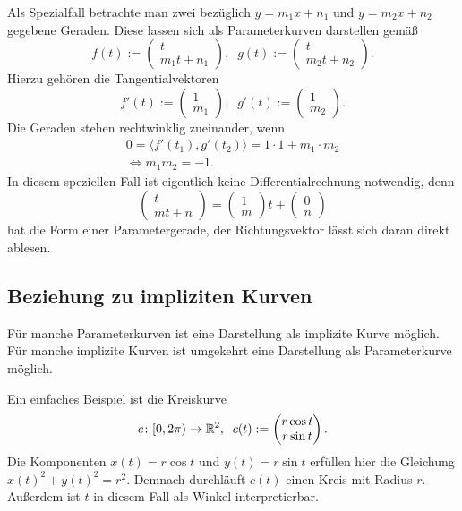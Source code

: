 Als Spezialfall betrachte man zwei bezüglich $y=m_1 x+n_1$ und
$y=m_2 x+n_2$ gegebene Geraden. Diese lassen sich als Parameterkurven
darstellen gemäß
\[
f(t) := \begin{pmatrix}t\\ m_1 t+n_1\end{pmatrix},\;\;
g(t) := \begin{pmatrix}t\\ m_2 t+n_2\end{pmatrix}.
\]
Hierzu gehören die Tangentialvektoren
\[
f'(t) := \begin{pmatrix}1\\ m_1\end{pmatrix},\;\;
g'(t) := \begin{pmatrix}1\\ m_2\end{pmatrix}.
\]
Die Geraden stehen rechtwinklig zueinander, wenn%
\begin{gather*}
0 = \langle f'(t_1),g'(t_2)\rangle = 1\cdot 1+m_1\cdot m_2\\
\iff m_1 m_2 = -1.
\end{gather*}
In diesem speziellen Fall ist eigentlich keine Differentialrechnung
notwendig, denn
\[\begin{pmatrix}t\\ m t+n\end{pmatrix}
= \begin{pmatrix}1\\ m\end{pmatrix}t+\begin{pmatrix}0\\ n\end{pmatrix}\]
hat die Form einer Parametergerade, der Richtungsvektor lässt sich
daran direkt ablesen.


\subsection{Beziehung zu impliziten Kurven}

Für manche Parameterkurven ist eine Darstellung als implizite
Kurve möglich. Für manche implizite Kurven ist umgekehrt eine
Darstellung als Parameterkurve möglich.

Ein einfaches Beispiel ist die Kreiskurve
\[c\colon{[0,2\pi)}\to\mathbb R^2,\;\;c(t):=\begin{pmatrix}
r\cos t\\
r\sin t
\end{pmatrix}.\]
Die Komponenten $x(t)=r\cos t$  und $y(t)=r\sin t$ erfüllen hier die
Gleichung $x(t)^2+y(t)^2=r^2$. Demnach durchläuft $c(t)$ einen
Kreis mit Radius $r$. Außerdem ist $t$ in diesem Fall als Winkel
interpretierbar.

